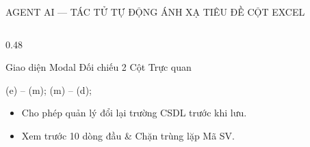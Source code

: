 \documentclass[aspectratio=169, 10pt]{beamer}
\begin{document}
\begin{frame}{AGENT AI — TÁC TỬ TỰ ĐỘNG ÁNH XẠ TIÊU ĐỀ CỘT EXCEL}
\begin{columns}[T]
\begin{column}{0.48\textwidth}
\begin{greenCard}{Giao diện Modal Đối chiếu 2 Cột Trực quan}
\begin{center}
{             (e) -- (m);
             (m) -- (d);
          }
        \end{center}
        \fontsize{6.5pt}{8pt}\selectfont
        \begin{itemize}
          \setlength{\itemsep}{1pt}
          \item Cho phép quản lý đổi lại trường CSDL trước khi lưu.
          \item Xem trước 10 dòng đầu \& Chặn trùng lặp Mã SV.
        \end{itemize}
      \end{greenCard}
    \end{column}
  \end{columns}
\end{frame}

\end{document}
